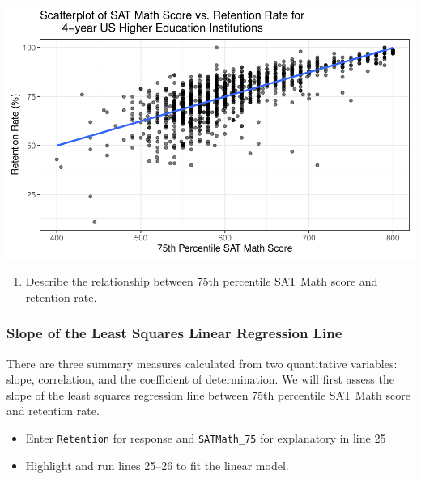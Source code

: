 \documentclass[
]{report}
\newenvironment{Shaded}{\begin{snugshade}}{\end{snugshade}}
\newcommand{\AttributeTok}[1]{\textcolor[rgb]{0.13,0.29,0.53}{#1}}
\newcommand{\CommentTok}[1]{\textcolor[rgb]{0.56,0.35,0.01}{\textit{#1}}}
\newcommand{\DecValTok}[1]{\textcolor[rgb]{0.00,0.00,0.81}{#1}}
\newcommand{\FunctionTok}[1]{\textcolor[rgb]{0.13,0.29,0.53}{\textbf{#1}}}
\newcommand{\NormalTok}[1]{#1}
\newcommand{\OtherTok}[1]{\textcolor[rgb]{0.56,0.35,0.01}{#1}}
\newcommand{\SpecialCharTok}[1]{\textcolor[rgb]{0.81,0.36,0.00}{\textbf{#1}}}
\providecommand{\tightlist}{%
  \setlength{\itemsep}{0pt}\setlength{\parskip}{0pt}}
\begin{document}
\begin{center}\includegraphics[width=0.7\linewidth]{13-A27-EDA-two-quantitative-corr_files/figure-latex/unnamed-chunk-2-1} \end{center}

\begin{enumerate}
\def\labelenumi{\arabic{enumi}.}
\tightlist
\item
  Describe the relationship between 75th percentile SAT Math score and retention rate.
\end{enumerate}

\vspace{1in}

\subsubsection*{Slope of the Least Squares Linear Regression Line}\label{slope-of-the-least-squares-linear-regression-line}

There are three summary measures calculated from two quantitative variables: slope, correlation, and the coefficient of determination. We will first assess the slope of the least squares regression line between 75th percentile SAT Math score and retention rate.

\begin{itemize}
\item
  Enter \texttt{Retention} for response and \texttt{SATMath\_75} for explanatory in line 25
\item
  Highlight and run lines 25--26 to fit the linear model.
\end{itemize}

\begin{Shaded}
\end{Shaded}
\end{document}
